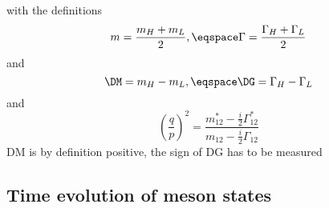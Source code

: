 %
with the definitions 
%
\begin{equation}
  m = \frac{m_H + m_L}{2}, \eqspace \Gamma = \frac{\Gamma_H + \Gamma_L}{2}
\end{equation}
%
and
%
\begin{equation}
  \DM = m_H - m_L, \eqspace \DG = \Gamma_H - \Gamma_L
\end{equation}
%
and
%
\begin{equation}
  \left(\frac{q}{p}\right)^2 = \frac{m_{12}^{\ast} - \frac{i}{2} \Gamma_{12}^{\ast}}{m_{12} - \frac{i}{2} \Gamma_{12}}
\end{equation}
%
DM is by definition positive, the sign of DG has to be measured

\subsection{Time evolution of meson states}
\label{sec:cpv_theory:flavour_physics:time_evolution}

